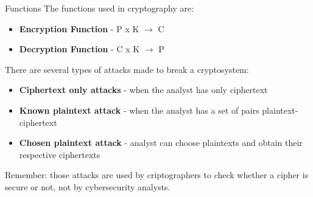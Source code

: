 \begin{key}{Functions}
    The functions used in cryptography are:
    \begin{itemize}
        \item \textbf{Encryption Function} - P x K $\rightarrow$ C
        \item \textbf{Decryption Function} - C x K $\rightarrow$ P
    \end{itemize}
\end{key}

There are several types of attacks made to break a cryptosystem:
\begin{itemize}
    \item \textbf{Ciphertext only attacks} - when the analyst has only 
    ciphertext
    \item \textbf{Known plaintext attack} - when the analyst has a set of
    pairs plaintext-ciphertext
    \item \textbf{Chosen plaintext attack} - analyst can choose plaintexts 
    and obtain their respective ciphertexts
\end{itemize}
\begin{warning}{}
    Remember: those attacks are used by criptographers to check whether a 
    cipher is secure or not, not by cybersecurity analysts. 
\end{warning}

